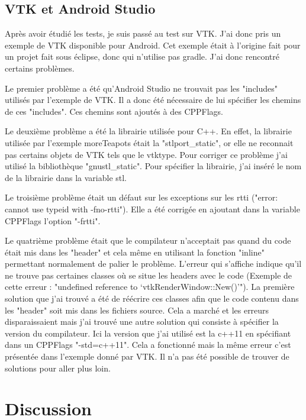 \documentclass[a4paper,12pt]{article}
\begin{document}
	\subsection{VTK et Android Studio}
	
	Après avoir étudié les tests, je suis passé au test sur VTK. J'ai donc pris un exemple de VTK disponible pour Android. Cet exemple était à l'origine fait pour un projet fait sous éclipse, donc qui n'utilise pas gradle. J'ai donc rencontré certains problèmes. 
	
	Le premier problème a été qu'Android Studio ne trouvait pas les "includes" utilisés par l'exemple de VTK. Il a donc été nécessaire de lui spécifier les chemins de ces "includes". Ces chemins sont ajoutés à des CPPFlags.
	
	Le deuxième problème a été la librairie utilisée pour C++. En effet, la librairie utilisée par l'exemple moreTeapots était la	 "stlport\_static", or elle ne reconnait pas certains objets de VTK tels que le vtktype. Pour corriger ce problème j'ai utilisé la bibliothèque "gnustl\_static". Pour spécifier la librairie, j'ai inséré le nom de la librairie dans la variable stl.
	
	Le troisième problème était un défaut sur les exceptions sur les rtti ("error: cannot use typeid with -fno-rtti"). Elle a été corrigée en ajoutant dans la variable CPPFlags l'option "-frtti".
	
	Le quatrième problème était que le compilateur n'acceptait pas quand du code était mis dans les "header" et cela même en utilisant la fonction "inline" permettant normalement de palier le problème. L'erreur qui s'affiche indique qu'il ne trouve pas certaines classes où se situe les headers avec le code (Exemple de cette erreur : "undefined reference to `vtkRenderWindow::New()'"). La première solution que j'ai trouvé a été de réécrire ces classes afin que le code contenu dans les "header" soit mis dans les fichiers source. Cela a marché et les erreurs disparaissaient mais j'ai trouvé une autre solution qui consiste à spécifier la version du compilateur. Ici la version que j'ai utilisé est la c++11 en spécifiant dans un CPPFlags "-std=c++11". Cela a fonctionné mais la m\^eme erreur c'est présentée dans l'exemple donné par VTK. Il n'a pas été possible de trouver de solutions pour aller plus loin.


\newpage
\section{Discussion}
\end{document}
